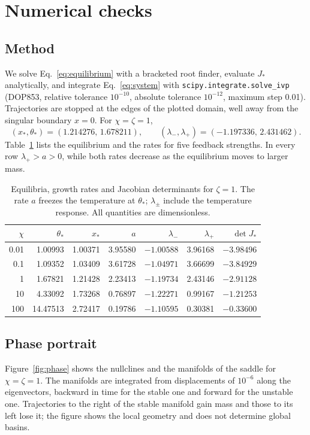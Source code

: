 \documentclass[11pt,a4paper]{article}
\begin{document}
\section{Numerical checks}\label{sec:numerics}
\subsection{Method}
We solve Eq.~\eqref{eq:equilibrium} with a bracketed root finder, evaluate $J_*$ analytically, and integrate Eq.~\eqref{eq:system} with \texttt{scipy.integrate.solve\_ivp} (DOP853, relative tolerance $10^{-10}$, absolute tolerance $10^{-12}$, maximum step 0.01). Trajectories are stopped at the edges of the plotted domain, well away from the singular boundary $x=0$. For $\chi=\zeta=1$,
\begin{equation*}
 (x_*,\theta_*)=(1.214276,\,1.678211),\qquad (\lambda_-,\lambda_+)=(-1.197336,\,2.431462).
\end{equation*}
Table~\ref{tab:scan} lists the equilibrium and the rates for five feedback strengths. In every row $\lambda_+>a>0$, while both rates decrease as the equilibrium moves to larger mass.

\begin{table}[tbp]
\centering\small
\caption{Equilibria, growth rates and Jacobian determinants for $\zeta=1$. The rate $a$ freezes the temperature at $\theta_*$; $\lambda_\pm$ include the temperature response. All quantities are dimensionless.}
\label{tab:scan}
\begin{tabular}{@{}rrrrrrr@{}}
\toprule
$\chi$ & $\theta_*$ & $x_*$ & $a$ & $\lambda_-$ & $\lambda_+$ & $\det J_*$\\
\midrule
0.01 & 1.00993 & 1.00371 & 3.95580 & $-1.00588$ & 3.96168 & $-3.98496$\\
0.1 & 1.09352 & 1.03409 & 3.61728 & $-1.04971$ & 3.66699 & $-3.84929$\\
1 & 1.67821 & 1.21428 & 2.23413 & $-1.19734$ & 2.43146 & $-2.91128$\\
10 & 4.33092 & 1.73268 & 0.76897 & $-1.22271$ & 0.99167 & $-1.21253$\\
100 & 14.47513 & 2.72417 & 0.19786 & $-1.10595$ & 0.30381 & $-0.33600$\\
\bottomrule
\end{tabular}
\end{table}

\subsection{Phase portrait}
Figure~\ref{fig:phase} shows the nullclines and the manifolds of the saddle for $\chi=\zeta=1$. The manifolds are integrated from displacements of $10^{-6}$ along the eigenvectors, backward in time for the stable one and forward for the unstable one. Trajectories to the right of the stable manifold gain mass and those to its left lose it; the figure shows the local geometry and does not determine global basins.
\end{document}
